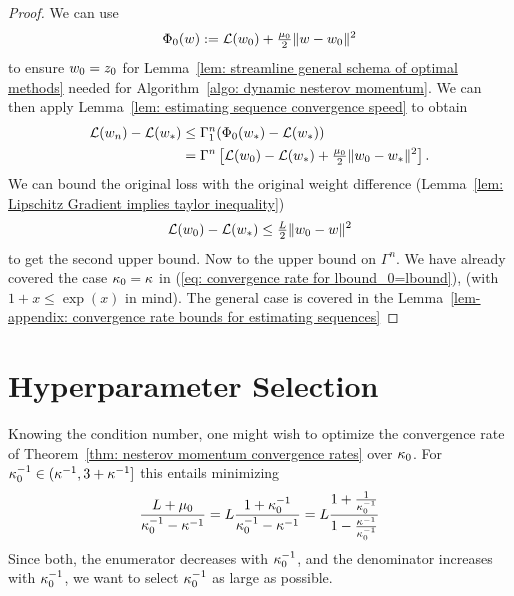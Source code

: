 \begin{proof}
	We can use
	\begin{align*}
		\Phi_0(w) := \mathcal{L}(w_0) + \tfrac{\mu_0}{2}\|w -w_0\|^2
	\end{align*}
	to ensure \(w_0=z_0\) for Lemma~\ref{lem: streamline general
	schema of optimal methods} needed for Algorithm~\ref{algo: dynamic nesterov
	momentum}. We can then apply Lemma~\ref{lem: estimating sequence
	convergence speed} to obtain
	\begin{align*}
		\mathcal{L}(w_n)-\mathcal{L}(w_*)
		&\le \Gamma_1^n(\Phi_0(w_*)-\mathcal{L}(w_*))\\
		&= \Gamma^n\left[
			\mathcal{L}(w_0) -\mathcal{L}(w_*)
			+ \tfrac{\mu_0}2\|w_0-w_*\|^2
		\right].
	\end{align*}	
	We can bound the original loss with the original weight difference
	(Lemma~\ref{lem: Lipschitz Gradient implies taylor inequality})
	\begin{align*}
		\mathcal{L}(w_0)-\mathcal{L}(w_*)\le \tfrac{L}{2}\|w_0-w\|^2
	\end{align*}
	to get the second upper bound.
	Now to the upper bound on \(\Gamma^n\). We have already covered the case
	\(\kappa_0=\kappa\) in (\ref{eq: convergence rate for lbound_0=lbound}),
	(with \(1+x\le\exp(x)\) in mind). The general case is covered in the
	Lemma~\ref{lem-appendix: convergence rate bounds for estimating sequences}
\end{proof}

\section{Hyperparameter Selection}

Knowing the condition number, one might wish to optimize the convergence rate
of Theorem~\ref{thm: nesterov momentum convergence rates} over \(\kappa_0\).
For \(\kappa_0^{-1}\in(\kappa^{-1}, 3+\kappa^{-1}]\) this entails
minimizing
\begin{align}\label{eq: convergence rate optimization}
	\frac{L+\mu_0}{\kappa_0^{-1}-\kappa^{-1}}
	= L \frac{1+\kappa_0^{-1}}{\kappa_0^{-1}-\kappa^{-1}}
	= L \frac{1+\frac{1}{\kappa_0^{-1}}}{1-\frac{\kappa^{-1}}{\kappa_0^{-1}}}
\end{align}
Since both, the enumerator decreases with \(\kappa_0^{-1}\), and the
denominator increases with \(\kappa_0^{-1}\), we want to select
\(\kappa_0^{-1}\) as large as possible.

